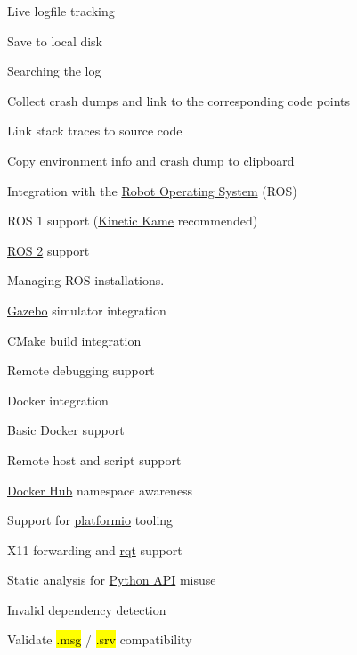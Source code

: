 \documentclass[12pt,initial,twoside,maitrise]{dms}
\newcommand{\cmark}{\textcolor{green!80!black}{\ding{51}}}
\newcommand{\done}{\rlap{$\square$}{\raisebox{2pt}{\large\hspace{1pt}\cmark}}%
\hspace{-2.5pt}}
\newcommand{\inline}[1]{%
    \begingroup%
    \sethlcolor{slightgray}%
    \hl{\ttfamily\footnotesize #1}%
    \endgroup
}
\numberwithin{equation}{section}
\numberwithin{table}{chapter}
\numberwithin{figure}{chapter}
\begin{document}
\begin{multicols}{2}
\begin{todolist}
    \begin{todolist}
    \item Live logfile tracking
    \item Save to local disk
    \item Searching the log
    \end{todolist}
\item Collect crash dumps and link to the corresponding code points
    \begin{todolist}
    \item Link stack traces to source code
    \item Copy environment info and crash dump to clipboard
    \end{todolist}
\item Integration with the \href{https://www.ros.org}{Robot Operating System} (ROS)
    \begin{todolist}
    \item[\done] ROS 1 support (\href{https://wiki.ros.org/kinetic}{Kinetic Kame} recommended)
    \item \href{https://github.com/ros2/ros2/wiki}{ROS 2} support
    \item[\done] Managing ROS installations.
    \end{todolist}
\item[\done] \href{http://gazebosim.org/}{Gazebo} simulator integration
\item CMake build integration
\item Remote debugging support
\item Docker integration
    \begin{todolist}
    \item[\done] Basic Docker support
    \item Remote host and script support
    \item \href{https://hub.docker.com}{Docker Hub} namespace awareness
    \item Support for \href{https://platformio.org}{platformio} tooling
    \item X11 forwarding and \href{https://wiki.ros.org/rqt}{rqt} support
    \end{todolist}
\item Static analysis for \href{https://wiki.ros.org/rospy}{Python API} misuse
    \begin{todolist}
    \item[\done] Invalid dependency detection
    \item Validate \inline{.msg}/\inline{.srv} compatibility

\end{todolist}
\end{todolist}
\end{multicols}
\end{document}
